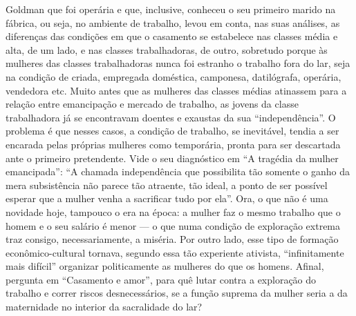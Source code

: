 Goldman que foi operária e que, inclusive, conheceu o seu primeiro
marido na fábrica, ou seja, no ambiente de trabalho, levou em conta, nas
suas análises, as diferenças das condições em que o casamento se
estabelece nas classes média e alta, de um lado, e nas classes
trabalhadoras, de outro, sobretudo porque às mulheres das classes
trabalhadoras nunca foi estranho o trabalho fora do lar, seja na
condição de criada, empregada doméstica, camponesa, datilógrafa,
operária, vendedora etc. Muito antes que as mulheres das classes médias
atinassem para a relação entre emancipação e mercado de trabalho, as
jovens da classe trabalhadora já se encontravam doentes e exaustas da
sua ``independência''. O problema é que nesses casos, a condição de
trabalho, se inevitável, tendia a ser encarada pelas próprias mulheres
como temporária, pronta para ser descartada ante o primeiro pretendente.
Vide o seu diagnóstico em ``A tragédia da mulher emancipada'': ``A
chamada independência que possibilita tão somente o ganho da mera
subsistência não parece tão atraente, tão ideal, a ponto de ser possível
esperar que a mulher venha a sacrificar tudo por ela''. Ora, o que não é
uma novidade hoje, tampouco o era na época: a mulher faz o mesmo
trabalho que o homem e o seu salário é menor --- o que numa condição de
exploração extrema traz consigo, necessariamente, a miséria. Por outro
lado, esse tipo de formação econômico-cultural tornava, segundo essa tão
experiente ativista, ``infinitamente mais difícil'' organizar
politicamente as mulheres do que os homens. Afinal, pergunta em
``Casamento e amor'', para quê lutar contra a exploração do trabalho e
correr riscos desnecessários, se a função suprema da mulher seria a da
maternidade no interior da sacralidade do lar?

